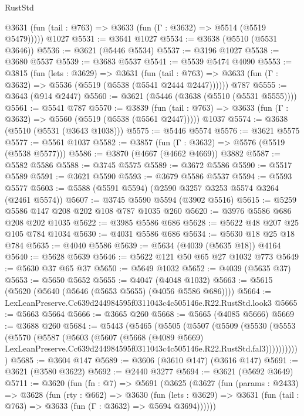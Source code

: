 \begin{lexlean}{RustStd}
\begin{coremodule}
      @3631 (fun (tail : @763) => @3633 (fun (Γ : @3632) => @5514 (@5519 @5479)))))
    @1027
@5531 := @3641 @1027
@5534 := @3638 (@5510 (@5531 @3646))
@5536 := @3621 (@5446 @5534)
@5537 := @3196 @1027
@5538 := @3680 @5537
@5539 := @3683 @5537
@5541 := @5539 @5474 @4090
@5553 := @3815
    (fun (lets : @3629) =>
    @3631
      (fun (tail : @763) => @3633 (fun (Γ : @3632) => @5536 (@5519 (@5538 (@5541 @2444 @2447))))))
    @787
@5555 := @3643 (@914 @2447)
@5560 := @3621 (@5446 (@3638 (@5510 (@5531 @5555))))
@5561 := @5541 @787
@5570 := @3839
    (fun (tail : @763) => @3633 (fun (Γ : @3632) => @5560 (@5519 (@5538 (@5561 @2447)))))
    @1037
@5574 := @3638 (@5510 (@5531 (@3643 @1038)))
@5575 := @5446 @5574
@5576 := @3621 @5575
@5577 := @5561 @1037
@5582 := @3857 (fun (Γ : @3632) => @5576 (@5519 (@5538 @5577)))
@5586 := @3870 (@4667 (@4662 @4669)) @3882
@5587 := @5582 @5586
@5588 := @3745 @5575
@5589 := @3672 @5586
@5590 := @5517 @5589
@5591 := @3621 @5590
@5593 := @3679 @5586 @5537
@5594 := @5593 @5577
@5603 := @5588 (@5591 @5594) (@2590 @3257 @3253 @5574 @3264 (@2461 @5574))
@5607 := @3745 @5590 @5594 (@3902 @5516)
@5615 := @5259 @5586 @147 @208 @202 @108 @787 @1035 @260
@5620 := @3976 @5586 @686 @208 @202 @1035
@5622 := @3985 @5586 @686
@5628 := @5622 @48 @207 @25 @105 @784 @1034
@5630 := @4031 @5586 @686
@5634 := @5630 @18 @25 @18 @784
@5635 := @4040 @5586
@5639 := @5634 (@4039 (@5635 @18)) @4164
@5640 := @5628 @5639
@5646 := @5622 @121 @50 @65 @27 @1032 @773
@5649 := @5630 @37 @65 @37
@5650 := @5649 @1032
@5652 := @4039 (@5635 @37)
@5653 := @5650 @5652
@5655 := @4047 (@4048 @1032)
@5663 := @5615 (@5620 (@5640 (@5646 (@5653 @5655) (@4056 @5586 @686))))
@5664 := LexLeanPreserve.Cc639d244984595f0311043c4c505146e.R22.RustStd.look3
@5665 := @5663 @5664
@5666 := @3665 @260
@5668 := @5665 (@4085 @5666)
@5669 := @3688 @260
@5684 := @5443
    (@5465
      (@5505
        (@5507
          (@5509
            (@5530
              (@5553
                (@5570
                  (@5587
                    (@5603
                      (@5607
                        (@5668
                          (@4089 @5669)
                          LexLeanPreserve.Cc639d244984595f0311043c4c505146e.R22.RustStd.fal3)))))))))))
@5685 := @3604 @147
@5689 := @3606 (@3610 @147) (@3616 @147)
@5691 := @3621 (@3580 @3622)
@5692 := @2440 @3277
@5694 := @3621 (@5692 @3649)
@5711 := @3620
    (fun (fn : @7) =>
    @5691
      (@3625
        (@3627
          (fun (params : @2433) =>
          @3628
            (fun (rty : @662) =>
            @3630
              (fun (lets : @3629) =>
              @3631 (fun (tail : @763) => @3633 (fun (Γ : @3632) => @5694 @3694))))))

\end{coremodule}
\end{lexlean}
